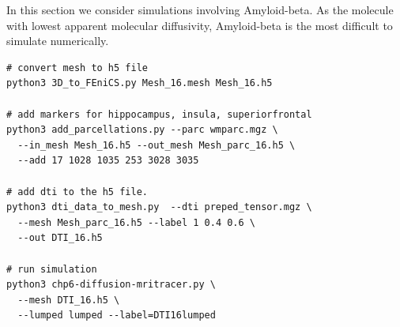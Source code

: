 In this section we consider simulations involving Amyloid-beta.  As the molecule 
with lowest apparent molecular diffusivity, Amyloid-beta is the most difficult 
to simulate numerically.  
\begin{lstlisting}[style=bashStyle]
# convert mesh to h5 file 
python3 3D_to_FEniCS.py Mesh_16.mesh Mesh_16.h5

# add markers for hippocampus, insula, superiorfrontal 
python3 add_parcellations.py --parc wmparc.mgz \ 
  --in_mesh Mesh_16.h5 --out_mesh Mesh_parc_16.h5 \ 
  --add 17 1028 1035 253 3028 3035    

# add dti to the h5 file. 
python3 dti_data_to_mesh.py  --dti preped_tensor.mgz \
  --mesh Mesh_parc_16.h5 --label 1 0.4 0.6 \ 
  --out DTI_16.h5 

# run simulation  
python3 chp6-diffusion-mritracer.py \ 
  --mesh DTI_16.h5 \ 
  --lumped lumped --label=DTI16lumped 
\end{lstlisting}

